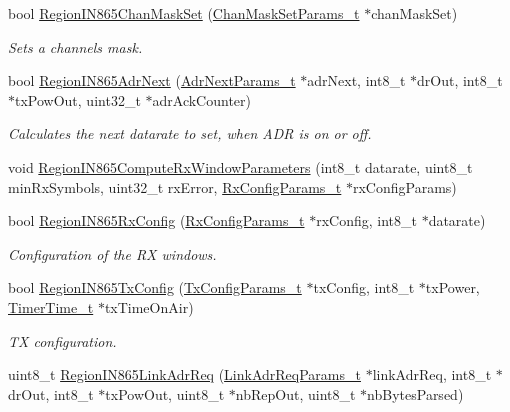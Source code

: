 \begin{DoxyCompactItemize}
bool \hyperlink{group__REGIONIN865_ga9568fece1e2e7622c00229e0aae806e2}{Region\+I\+N865\+Chan\+Mask\+Set} (\hyperlink{group__REGION_ga6d24f7da136006410827dfb29f6b9b9e}{Chan\+Mask\+Set\+Params\+\_\+t} $\ast$chan\+Mask\+Set)
\begin{DoxyCompactList}\small\item\em Sets a channels mask. \end{DoxyCompactList}\item 
bool \hyperlink{group__REGIONIN865_ga727c685b4ed8839cfcb83b2c3980f14c}{Region\+I\+N865\+Adr\+Next} (\hyperlink{group__REGION_ga567c2742622326b350b4e91bbf61b4ce}{Adr\+Next\+Params\+\_\+t} $\ast$adr\+Next, int8\+\_\+t $\ast$dr\+Out, int8\+\_\+t $\ast$tx\+Pow\+Out, uint32\+\_\+t $\ast$adr\+Ack\+Counter)
\begin{DoxyCompactList}\small\item\em Calculates the next datarate to set, when A\+DR is on or off. \end{DoxyCompactList}\item 
void \hyperlink{group__REGIONIN865_ga66be427601e7105b522c36160c8513a7}{Region\+I\+N865\+Compute\+Rx\+Window\+Parameters} (int8\+\_\+t datarate, uint8\+\_\+t min\+Rx\+Symbols, uint32\+\_\+t rx\+Error, \hyperlink{group__REGION_ga375c038078dfcfc7ef14280021db719e}{Rx\+Config\+Params\+\_\+t} $\ast$rx\+Config\+Params)
\item 
bool \hyperlink{group__REGIONIN865_ga2d222860d58d1d5175f0486b572870c5}{Region\+I\+N865\+Rx\+Config} (\hyperlink{group__REGION_ga375c038078dfcfc7ef14280021db719e}{Rx\+Config\+Params\+\_\+t} $\ast$rx\+Config, int8\+\_\+t $\ast$datarate)
\begin{DoxyCompactList}\small\item\em Configuration of the RX windows. \end{DoxyCompactList}\item 
bool \hyperlink{group__REGIONIN865_gaab270c31d45ea8a203ca428e20de4988}{Region\+I\+N865\+Tx\+Config} (\hyperlink{group__REGION_gabed730d4d04b0b60d4b6d1966d3f21d3}{Tx\+Config\+Params\+\_\+t} $\ast$tx\+Config, int8\+\_\+t $\ast$tx\+Power, \hyperlink{utilities_8h_a4215ca43d3e953099ea758ce428599d0}{Timer\+Time\+\_\+t} $\ast$tx\+Time\+On\+Air)
\begin{DoxyCompactList}\small\item\em TX configuration. \end{DoxyCompactList}\item 
uint8\+\_\+t \hyperlink{group__REGIONIN865_ga97f6332c9583f63e5bbb00b123d80698}{Region\+I\+N865\+Link\+Adr\+Req} (\hyperlink{group__REGION_gad4af503e8d4de1846129e26a799a1e8e}{Link\+Adr\+Req\+Params\+\_\+t} $\ast$link\+Adr\+Req, int8\+\_\+t $\ast$dr\+Out, int8\+\_\+t $\ast$tx\+Pow\+Out, uint8\+\_\+t $\ast$nb\+Rep\+Out, uint8\+\_\+t $\ast$nb\+Bytes\+Parsed)

\end{DoxyCompactItemize}
